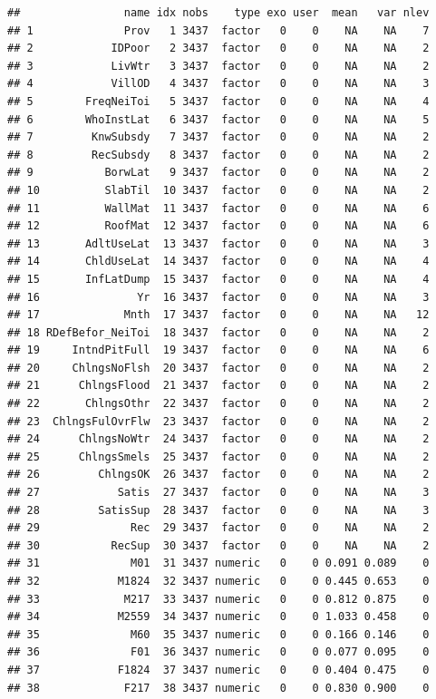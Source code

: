 \documentclass[11pt,]{article}
\begin{document}
\begin{verbatim}
##                name idx nobs    type exo user  mean   var nlev
## 1              Prov   1 3437  factor   0    0    NA    NA    7
## 2            IDPoor   2 3437  factor   0    0    NA    NA    2
## 3            LivWtr   3 3437  factor   0    0    NA    NA    2
## 4            VillOD   4 3437  factor   0    0    NA    NA    3
## 5        FreqNeiToi   5 3437  factor   0    0    NA    NA    4
## 6        WhoInstLat   6 3437  factor   0    0    NA    NA    5
## 7         KnwSubsdy   7 3437  factor   0    0    NA    NA    2
## 8         RecSubsdy   8 3437  factor   0    0    NA    NA    2
## 9           BorwLat   9 3437  factor   0    0    NA    NA    2
## 10          SlabTil  10 3437  factor   0    0    NA    NA    2
## 11          WallMat  11 3437  factor   0    0    NA    NA    6
## 12          RoofMat  12 3437  factor   0    0    NA    NA    6
## 13       AdltUseLat  13 3437  factor   0    0    NA    NA    3
## 14       ChldUseLat  14 3437  factor   0    0    NA    NA    4
## 15       InfLatDump  15 3437  factor   0    0    NA    NA    4
## 16               Yr  16 3437  factor   0    0    NA    NA    3
## 17             Mnth  17 3437  factor   0    0    NA    NA   12
## 18 RDefBefor_NeiToi  18 3437  factor   0    0    NA    NA    2
## 19     IntndPitFull  19 3437  factor   0    0    NA    NA    6
## 20     ChlngsNoFlsh  20 3437  factor   0    0    NA    NA    2
## 21      ChlngsFlood  21 3437  factor   0    0    NA    NA    2
## 22       ChlngsOthr  22 3437  factor   0    0    NA    NA    2
## 23  ChlngsFulOvrFlw  23 3437  factor   0    0    NA    NA    2
## 24      ChlngsNoWtr  24 3437  factor   0    0    NA    NA    2
## 25      ChlngsSmels  25 3437  factor   0    0    NA    NA    2
## 26         ChlngsOK  26 3437  factor   0    0    NA    NA    2
## 27            Satis  27 3437  factor   0    0    NA    NA    3
## 28         SatisSup  28 3437  factor   0    0    NA    NA    3
## 29              Rec  29 3437  factor   0    0    NA    NA    2
## 30           RecSup  30 3437  factor   0    0    NA    NA    2
## 31              M01  31 3437 numeric   0    0 0.091 0.089    0
## 32            M1824  32 3437 numeric   0    0 0.445 0.653    0
## 33             M217  33 3437 numeric   0    0 0.812 0.875    0
## 34            M2559  34 3437 numeric   0    0 1.033 0.458    0
## 35              M60  35 3437 numeric   0    0 0.166 0.146    0
## 36              F01  36 3437 numeric   0    0 0.077 0.095    0
## 37            F1824  37 3437 numeric   0    0 0.404 0.475    0
## 38             F217  38 3437 numeric   0    0 0.830 0.900    0

\end{verbatim}
\end{document}
